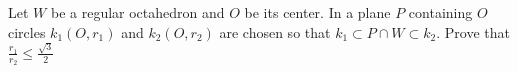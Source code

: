 Let $W$ be a regular octahedron and $O$ be its center. In a plane $P$ containing $O$ circles $k_1(O,r_1)$ and $k_2(O,r_2)$ are chosen so that $k_1 \subset P\cap W  \subset k_2$. Prove that $\frac{r_1}{r_2}\le \frac{\sqrt3}{2}$